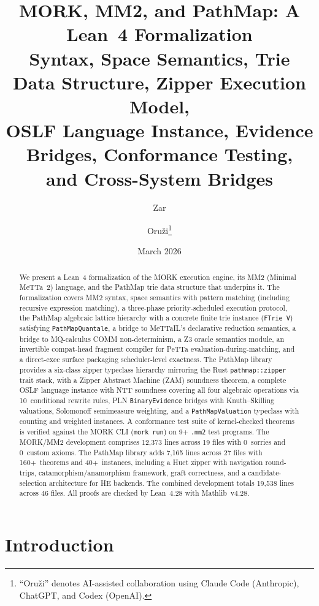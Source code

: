 \documentclass[11pt]{article}
\title{MORK, MM2, and PathMap: A Lean~4 Formalization\\
\large Syntax, Space Semantics, Trie Data Structure, Zipper Execution Model,\\
OSLF Language Instance, Evidence Bridges, Conformance Testing,\\
and Cross-System Bridges}
\author{Zar \and Oru\v{z}i\footnote{%
``Oru\v{z}i'' denotes AI-assisted collaboration
using Claude Code (Anthropic), ChatGPT, and Codex (OpenAI).}}
\date{March 2026}
\theoremstyle{definition}
\theoremstyle{remark}
\newcommand{\MORK}{\textup{MORK}}
\newcommand{\MeTTa}{\textup{MeTTa}}
\newcommand{\MeTTaIL}{\textup{MeTTaIL}}
\newcommand{\HE}{\textup{HE}}
\newcommand{\PathMap}{\textup{PathMap}}
\begin{document}
\maketitle

\begin{abstract}
We present a Lean~4 formalization of the \MORK{} execution engine, its
MM2 (Minimal \MeTTa{}~2) language, and the \PathMap{} trie data structure
that underpins it.
The formalization covers MM2 syntax, space semantics with pattern matching
(including recursive expression matching), a three-phase priority-scheduled
execution protocol, the \PathMap{} algebraic lattice hierarchy with a
concrete finite trie instance (\texttt{FTrie\,V}) satisfying
\texttt{PathMapQuantale}, a bridge to \MeTTaIL{}'s declarative reduction
semantics, a bridge to MQ-calculus COMM non-determinism,
a Z3 oracle semantics module,
an invertible compat-head fragment compiler for PeTTa evaluation-during-matching,
and a direct-exec surface packaging scheduler-level exactness.
%
The \PathMap{} library provides a six-class zipper typeclass hierarchy
mirroring the Rust \texttt{pathmap::zipper} trait stack, with a Zipper Abstract
Machine (ZAM) soundness theorem, a complete OSLF language instance with
NTT soundness covering all four algebraic operations via 10~conditional
rewrite rules, PLN \texttt{BinaryEvidence} bridges with Knuth--Skilling
valuations, Solomonoff semimeasure weighting, and a \texttt{PathMapValuation}
typeclass with counting and weighted instances.
%
A conformance test suite of kernel-checked theorems is verified against
the \MORK{} CLI (\texttt{mork run}) on 9+ \texttt{.mm2} test programs.
The \MORK{}/MM2 development comprises 12{,}373 lines across 19 files with
0~sorries and 0~custom axioms.
The \PathMap{} library adds 7{,}165 lines across 27 files with
160+~theorems and 40+~instances, including a Huet zipper with
navigation round-trips, catamorphism/anamorphism framework,
graft correctness, and a candidate-selection architecture for
\HE{} backends.
The combined development totals 19{,}538 lines across 46 files.
All proofs are checked by Lean~4.28 with Mathlib~v4.28.
\end{abstract}

\tableofcontents

\section{Introduction}
\label{sec:intro}
\end{document}
